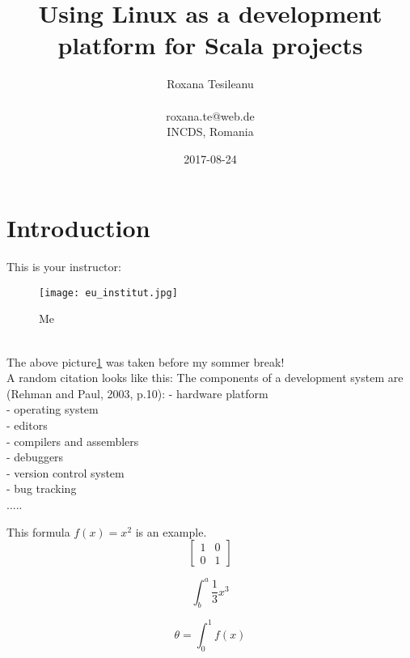 \documentclass{article}
\title{Using Linux as a development platform for Scala projects}
\date{2017-08-24}
\author{Roxana Tesileanu \\ 
\\ 
roxana.te@web.de \\
INCDS, Romania }
\begin{document}
	\maketitle
	\newpage

\tableofcontents
\newpage

\section{Introduction}

This is your instructor:\\
\begin{figure} [h!]
 \texttt{[image: eu\_institut.jpg]}
 \caption{Me}
 \label{fig: Roxi}
\end{figure}
\\
The above picture\ref{fig: Roxi}  was taken before my sommer break!
\\


A random citation looks like this:
\autocite[1]{odersky_programming_2010}
The components of a development system are (Rehman and Paul, 2003, p.10):\newline
- hardware platform \\
- operating system \\
- editors \\
- compilers and assemblers \\
- debuggers \\
- version control system \\
- bug tracking \\

.....

This formula $f(x) = x^2$ is an example.
\begin{equation}
\left[
\begin{matrix}
1 & 0 \\
0 & 1
\end{matrix}
\right]
\end{equation}

\begin{equation}
\int^a_b\frac{1}{3}x^3
\end{equation}

\begin{equation}
\theta = \int^1_0 f(x)
\end{equation}
\end{document}
